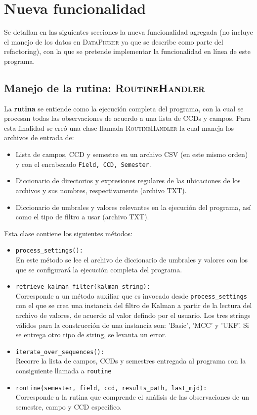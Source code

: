 \chapter{Nueva funcionalidad}
\label{ch:news}
Se detallan en las siguientes secciones la nueva funcionalidad agregada (no incluye el manejo de los datos en \textsc{DataPicker} ya que se describe como parte del refactoring), con la que se pretende implementar la funcionalidad en l\'inea de  este programa. 
\section{Manejo de la rutina: \textsc{RoutineHandler}}
La \textbf{rutina} se entiende como la ejecuci\'on completa del programa, con la cual se procesan todas las observaciones de acuerdo a una lista de CCDs y campos. Para esta finalidad se cre\'o una clase llamada \textsc{RoutineHandler} la cual maneja los archivos de entrada de:
\begin{itemize}
\item Lista de campos, CCD y semestre en un archivo CSV (en este mismo orden) y con el encabezado \texttt{Field, CCD, Semester}.  
\item Diccionario de directorios y expresiones regulares de las ubicaciones de los archivos y sus nombres, respectivamente (archivo TXT). 
\item Diccionario de umbrales y valores relevantes en la ejecuci\'on del programa, as\'i como el tipo de filtro a usar (archivo TXT).
\end{itemize}
\bigskip

Esta clase contiene los siguientes m\'etodos:
\begin{itemize}
\item \texttt{process\_settings():}\\
En este m\'etodo se lee el archivo de diccionario de umbrales y valores con los que se configurar\'a la ejecuci\'on completa del programa.
\bigskip

\item \texttt{retrieve\_kalman\_filter(kalman\_string):}\\
Corresponde a un m\'etodo auxiliar que es invocado desde \texttt{process\_settings} con el que se crea una instancia del filtro de Kalman a partir de la lectura del archivo de valores, de acuerdo al valor defindo por el usuario. Los tres strings v\'alidos para la construcci\'on de una instancia son: 'Basic', 'MCC' y 'UKF'. Si se entrega otro tipo de string, se levanta un error.
\bigskip
  
\item \texttt{iterate\_over\_sequences():}\\
Recorre la lista de campos, CCDs y semestres entregada al programa con la consiguiente llamada a \texttt{routine}
\bigskip

\item \texttt{routine(semester, field, ccd, results\_path, last\_mjd):}\\
Corresponde a la rutina que comprende el an\'alisis de las observaciones de un semestre, campo y CCD espec\'ifico. 
\end{itemize}  
\bigskip

